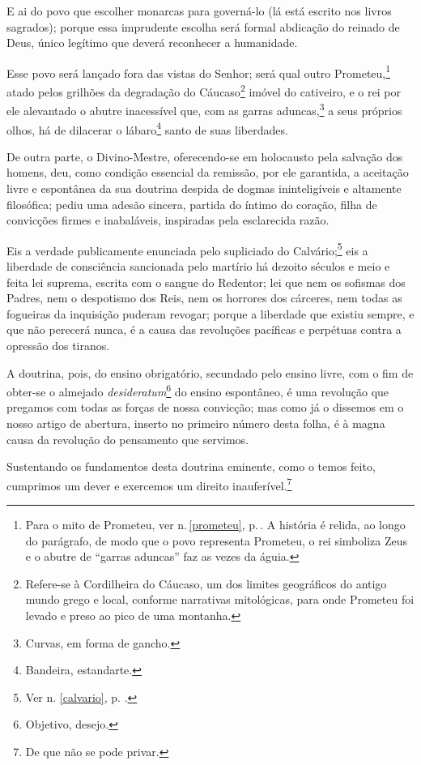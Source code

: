 E ai do povo que escolher monarcas para governá-lo (lá está escrito nos
livros sagrados); porque essa imprudente escolha será formal abdicação
do reinado de Deus, único legítimo que deverá reconhecer a humanidade.

Esse povo será lançado fora das vistas do Senhor; será qual outro
Prometeu,\footnote{Para o mito de Prometeu, ver n.\,\ref{prometeu}, p.\,\pageref{prometeu}. A história é relida, ao longo do parágrafo, de modo que o povo
  representa Prometeu, o rei simboliza Zeus e o abutre de ``garras
  aduncas'' faz as vezes da águia.} atado pelos grilhões da degradação
do Cáucaso\footnote{Refere-se à Cordilheira do Cáucaso, um dos limites
  geográficos do antigo mundo grego e local, conforme narrativas
  mitológicas, para onde Prometeu foi levado e preso ao pico de uma
  montanha.} imóvel do cativeiro, e o rei por ele alevantado o abutre
inacessível que, com as garras aduncas,\footnote{Curvas, em forma de
  gancho.} a seus próprios olhos, há de dilacerar o lábaro\footnote{
  Bandeira, estandarte.} santo de suas liberdades.

De outra parte, o Divino-Mestre, oferecendo-se em holocausto pela
salvação dos homens, deu, como condição essencial da remissão, por ele
garantida, a aceitação livre e espontânea da sua doutrina despida de
dogmas ininteligíveis e altamente filosófica; pediu uma adesão sincera,
partida do íntimo do coração, filha de convicções firmes e inabaláveis,
inspiradas pela esclarecida razão.

Eis a verdade publicamente enunciada pelo supliciado do
Calvário;\footnote{Ver n. \ref{calvario}, p. \pageref{calvario}.} eis a 
liberdade de consciência sancionada pelo martírio
há dezoito séculos e meio e feita lei suprema, escrita com o sangue do
Redentor; lei que nem os sofismas dos Padres, nem o despotismo dos Reis,
nem os horrores dos cárceres, nem todas as fogueiras da inquisição
puderam revogar; porque a liberdade que existiu sempre, e que não
perecerá nunca, é a causa das revoluções pacíficas e perpétuas contra a
opressão dos tiranos.

A doutrina, pois, do ensino obrigatório, secundado pelo ensino livre,
com o fim de obter-se o almejado \textit{desideratum}\footnote{Objetivo,
  desejo.} do ensino espontâneo, é uma revolução que pregamos com todas
as forças de nossa convicção; mas como já o dissemos em o nosso artigo
de abertura, inserto no primeiro número desta folha, é à magna causa da
revolução do pensamento que servimos.

Sustentando os fundamentos desta doutrina eminente, como o temos feito,
cumprimos um dever e exercemos um direito inauferível.\footnote{De que
  não se pode privar.}

